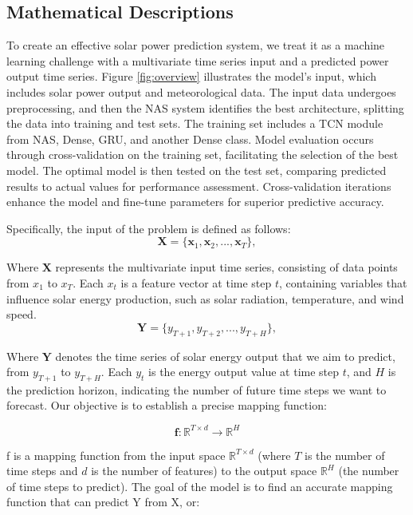 \documentclass[sn-mathphys-num]{sn-jnl}%
\begin{document}
\subsection{Mathematical Descriptions}
To create an effective solar power prediction system, we treat it as a machine learning challenge with a multivariate time series input and a predicted power output time series. Figure \ref{fig:overview} illustrates the model's input, which includes solar power output and meteorological data. The input data undergoes preprocessing, and then the NAS system identifies the best architecture, splitting the data into training and test sets. The training set includes a TCN module from NAS, Dense, GRU, and another Dense class. Model evaluation occurs through cross-validation on the training set, facilitating the selection of the best model. The optimal model is then tested on the test set, comparing predicted results to actual values for performance assessment. Cross-validation iterations enhance the model and fine-tune parameters for superior predictive accuracy.


Specifically, the input of the problem is defined as follows:
\begin{equation}
\mathbf{X} = \{\mathbf{x}_1, \mathbf{x}_2, ..., \mathbf{x}_T\}, 
\end{equation}

Where $\mathbf{X}$ represents the multivariate input time series, consisting of data points from \(x_1\) to \(x_T\). Each \(x_t\) is a feature vector at time step \(t\), containing variables that influence solar energy production, such as solar radiation, temperature, and wind speed.
\begin{equation}
\mathbf{Y} = \{y_{T+1}, y_{T+2}, ..., y_{T+H}\},
\end{equation}

Where $\mathbf{Y}$ denotes the time series of solar energy output that we aim to predict, from \(y_{T+1}\) to \(y_{T+H}\). Each \(y_t\) is the energy output value at time step \(t\), and \(H\) is the prediction horizon, indicating the number of future time steps we want to forecast. Our objective is to establish a precise mapping function:

\begin{equation}
\mathbf{f}: \mathbb{R}^{T \times d} \rightarrow \mathbb{R}^H
\end{equation}

f is a mapping function from the input space \(\mathbb{R}^{T \times d}\) (where \(T\) is the number of time steps and \(d\) is the number of features) to the output space \(\mathbb{R}^H\) (the number of time steps to predict). The goal of the model is to find an accurate mapping function that can predict Y from X, or:
\end{document}
